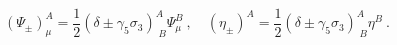 \begin{equation} \label{defpmspinors}
	(\Psi_{\pm})_\mu^A=\frac{1}{2}(\delta\pm\gamma_5\sigma_{3})^{A}_{\;B}\Psi_\mu^B\ ,\quad (\eta_{\pm})^A=\frac{1}{2}(\delta\pm\gamma_5\sigma_{3})^{A}_{\;B}\eta^B\ .
	\end{equation} 
